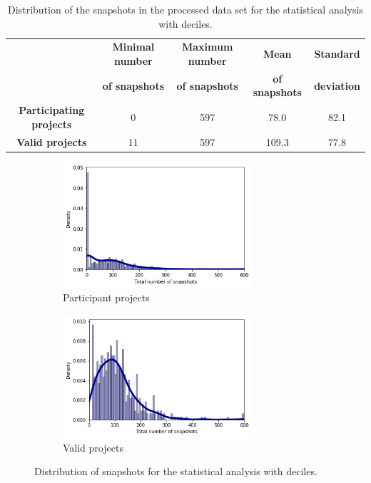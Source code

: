 \begin{table}
    \centering
    \begin{tabular}{|c|c|c|c|c|}
        \hline
        & \textbf{Minimal number} & \textbf{Maximum number} & \textbf{Mean} &\textbf{Standard} \\
        & \textbf{of snapshots} & \textbf{of snapshots} & \textbf{of snapshots} & \textbf{deviation} \\ \hline
        \textbf{Participating projects} & 0 & 597 & 78.0 & 82.1 \\ \hline
        \textbf{Valid projects} & 11 & 597 & 109.3 & 77.8 \\ \hline
    \end{tabular}
    \caption{Distribution of the snapshots in the processed data set for the statistical analysis with deciles.}
    \label{table:statistical_analysis_distribution_snapshots}
\end{table}

\begin{figure}
  \centering
  \begin{subfigure}{7cm}
    \includegraphics[width=7cm]{img/snapshots_participant_projects.png}
    \caption{Participant projects}
    \label{subfig:participant_projects}
  \end{subfigure}
  \begin{subfigure}{7cm}
    \includegraphics[width=7cm]{img/snapshots_valid_projects.png}
    \caption{Valid projects}
    \label{subfig:valid_projects}
  \end{subfigure}
  \caption{Distribution of snapshots for the statistical analysis with deciles.}
  \label{fig:distribution_snapshots_deciles}
\end{figure} 


